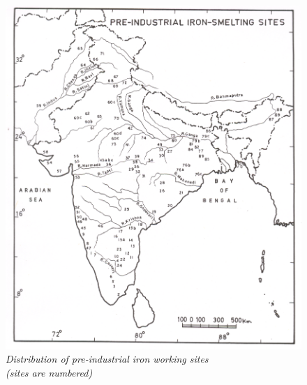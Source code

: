\newpage

\begin{figure}[H]
\begin{center}
\includegraphics[scale=0.47]{images/chapter-1/fig003.jpg}
\caption{\textit{Distribution of pre-industrial iron working sites\\ (sites are numbered)}}\label{chapter1-fig003}
\end{center}
\end{figure}

\newpage

